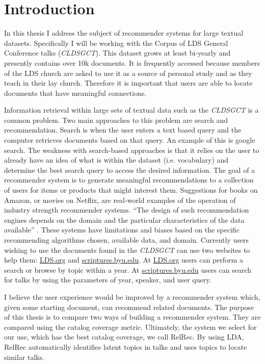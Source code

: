 \chapter{Introduction}

In this thesis I address the subject of recommender systems for large textual datasets. Specifically I will be working with the Corpus of LDS General Conference talks (\textit{CLDSGCT}). This dataset grows at least bi-yearly and presently contains over 10k documents. It is frequently accessed because members of the LDS church are asked to use it as a source of personal study and as they teach in their lay church. Therefore it is important that users are able to locate documents that have meaningful connections.

Information retrieval within large sets of textual data such as the \textit{CLDSGCT} is a common problem. Two main approaches to this problem are search and recommendation. Search is when the user enters a text based query and the computer retrieves documents based on that query. An example of this is google search. The weakness with search-based approaches is that it relies on the user to already have an idea of what is within the dataset (i.e. vocabulary) and determine the best search query to access the desired information. The goal of a recommender system is to generate meaningful recommendations to a collection of users for items or products that might interest them. Suggestions for books on Amazon, or movies on Netflix, are real-world examples of the operation of industry strength recommender systems. ``The design of such recommendation engines depends on the domain and the particular characteristics of the data available'' \citep{Melville2010}. These systems have limitations and biases based on the specific recommending algorithms chosen, available data, and domain. Currently users wishing to use the documents found in the \textit{CLDSGCT} can use two websites to help them: \url{LDS.org} and \url{scriptures.byu.edu}. At \url{LDS.org} users can perform a search or browse by topic within a year. At \url{scriptures.byu.edu} users can search for talks by using the parameters of year, speaker, and user query.

I believe the user experience would be improved by a recommender system which, given some starting document, can recommend related documents. The purpose of this thesis is to compare two ways of building a recommender system. They are compared using the catalog coverage metric. Ultimately, the system we select for our use, which has the best catalog coverage, we call RelRec. By using LDA, RelRec automatically identifies latent topics in talks and uses topics to locate similar talks.
